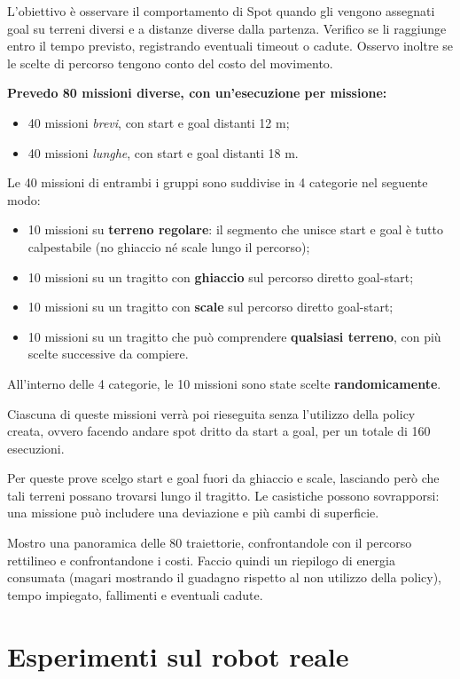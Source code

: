 \documentclass[11pt,a4paper]{article}
\begin{document}
L'obiettivo è osservare il comportamento di Spot quando gli vengono assegnati goal su terreni diversi e a distanze diverse dalla partenza. Verifico se li raggiunge entro il tempo previsto, registrando eventuali timeout o cadute. Osservo inoltre se le scelte di percorso tengono conto del costo del movimento.


\textbf{Prevedo 80 missioni diverse, con un'esecuzione per missione:}
\begin{itemize}
\item 40 missioni \textit{brevi}, con start e goal distanti 12 m;
\item 40 missioni \textit{lunghe}, con start e goal distanti 18 m.
\end{itemize}

Le 40 missioni di entrambi i gruppi sono suddivise in 4 categorie nel seguente modo:
\begin{itemize}
\item 10 missioni su \textbf{terreno regolare}: il segmento che unisce start e goal è tutto calpestabile (no ghiaccio né scale lungo il percorso);
\item 10 missioni su un tragitto con \textbf{ghiaccio} sul percorso diretto goal-start;
\item 10 missioni su un tragitto con \textbf{scale}  sul percorso diretto goal-start;
\item 10 missioni su un tragitto che può comprendere \textbf{qualsiasi terreno}, con più scelte successive da compiere.
\end{itemize}

All'interno delle 4 categorie, le 10 missioni sono state scelte \textbf{randomicamente}.

Ciascuna di queste missioni verrà poi rieseguita senza l'utilizzo della policy creata, ovvero facendo andare spot dritto da start a goal, per un totale di 160 esecuzioni.

Per queste prove scelgo start e goal fuori da ghiaccio e scale, lasciando però che tali terreni possano trovarsi lungo il tragitto.
Le casistiche possono sovrapporsi: una missione può includere una deviazione e più cambi di superficie.

Mostro una panoramica delle 80 traiettorie, confrontandole con il percorso rettilineo e confrontandone i costi.
Faccio quindi un riepilogo di energia consumata (magari mostrando il guadagno rispetto al non utilizzo della policy), tempo impiegato, fallimenti e eventuali cadute.

\section{Esperimenti sul robot reale}
\end{document}
